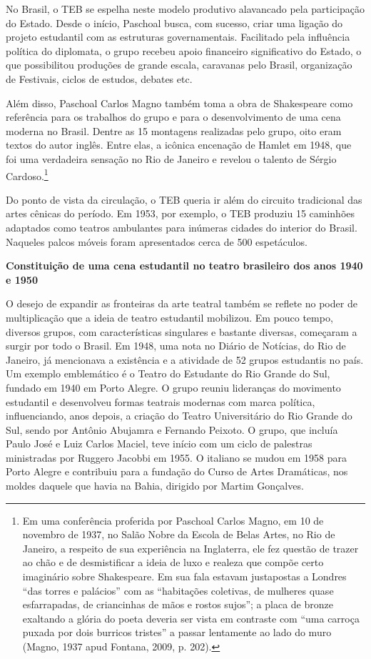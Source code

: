 No Brasil, o TEB se espelha neste modelo produtivo alavancado pela
participação do Estado. Desde o início, Paschoal busca, com sucesso,
criar uma ligação do projeto estudantil com as estruturas
governamentais. Facilitado pela influência política do diplomata, o
grupo recebeu apoio financeiro significativo do Estado, o que
possibilitou produções de grande escala, caravanas pelo Brasil,
organização de Festivais, ciclos de estudos, debates etc.

Além disso, Paschoal Carlos Magno também toma a obra de Shakespeare como
referência para os trabalhos do grupo e para o desenvolvimento de uma
cena moderna no Brasil. Dentre as 15 montagens realizadas pelo grupo,
oito eram textos do autor inglês. Entre elas, a icônica encenação de
Hamlet em 1948, que foi uma verdadeira sensação no Rio de Janeiro e
revelou o talento de Sérgio Cardoso.\footnote{Em uma conferência
  proferida por Paschoal Carlos Magno, em 10 de novembro de 1937, no
  Salão Nobre da Escola de Belas Artes, no Rio de Janeiro, a respeito de
  sua experiência na Inglaterra, ele fez questão de trazer ao chão e de
  desmistificar a ideia de luxo e realeza que compõe certo imaginário
  sobre Shakespeare. Em sua fala estavam justapostas a Londres “das
  torres e palácios” com as “habitações coletivas, de mulheres quase
  esfarrapadas, de criancinhas de mãos e rostos sujos”; a placa de
  bronze exaltando a glória do poeta deveria ser vista em contraste com
  “uma carroça puxada por dois burricos tristes” a passar lentamente ao
  lado do muro (Magno, 1937 apud Fontana, 2009, p. 202).}

Do ponto de vista da circulação, o TEB queria ir além do circuito
tradicional das artes cênicas do período. Em 1953, por exemplo, o TEB
produziu 15 caminhões adaptados como teatros ambulantes para inúmeras
cidades do interior do Brasil. Naqueles palcos móveis foram apresentados
cerca de 500 espetáculos.

\textbf{Constituição de uma cena estudantil no teatro brasileiro dos anos
1940 e 1950}

O desejo de expandir as fronteiras da arte teatral também se reflete no
poder de multiplicação que a ideia de teatro estudantil mobilizou. Em
pouco tempo, diversos grupos, com características singulares e bastante
diversas, começaram a surgir por todo o Brasil. Em 1948, uma nota no
Diário de Notícias, do Rio de Janeiro, já mencionava a existência e a
atividade de 52 grupos estudantis no país. Um exemplo emblemático é o
Teatro do Estudante do Rio Grande do Sul, fundado em 1940 em Porto
Alegre. O grupo reuniu lideranças do movimento estudantil e desenvolveu
formas teatrais modernas com marca política, influenciando, anos depois,
a criação do Teatro Universitário do Rio Grande do Sul, sendo por
Antônio Abujamra e Fernando Peixoto. O grupo, que incluía Paulo José e
Luiz Carlos Maciel, teve início com um ciclo de palestras ministradas
por Ruggero Jacobbi em 1955. O italiano se mudou em 1958 para Porto
Alegre e contribuiu para a fundação do Curso de Artes Dramáticas, nos
moldes daquele que havia na Bahia, dirigido por Martim Gonçalves.

